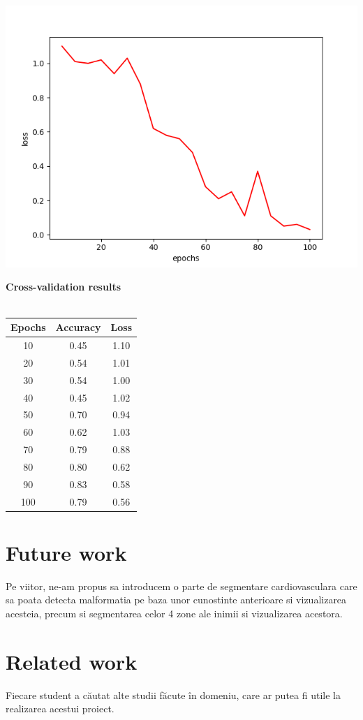 \documentclass[a4papaer,12pt]{article}
\begin{document}
\includegraphics[scale=0.5]{Loss-Epochs.png}


\indent \textbf{Cross-validation results}
\\
\\
\begin{tabular}{|c|c|c|}
	\hline
	Epochs & Accuracy & Loss \\
	\hline
	10 & 0.45 & 1.10 \\
	\hline
	20 & 0.54 & 1.01 \\
	\hline
	30 & 0.54 & 1.00 \\
	\hline
	40 & 0.45 & 1.02 \\	
	\hline
	50 & 0.70 & 0.94 \\
	\hline
	60 & 0.62 & 1.03 \\	
	\hline
	70 & 0.79 & 0.88 \\
	\hline
	80 & 0.80 & 0.62 \\	
	\hline
	90 & 0.83 & 0.58 \\
	\hline
	100 & 0.79 & 0.56 \\		
	\hline
\end{tabular}

\section{Future work}

Pe viitor, ne-am propus sa introducem o parte de segmentare cardiovasculara care sa poata detecta malformatia pe baza unor cunostinte anterioare si vizualizarea acesteia, precum si segmentarea celor 4 zone ale inimii si vizualizarea acestora. 
\newpage

\section{Related work}
Fiecare student a căutat alte studii făcute în domeniu, care ar putea fi utile la realizarea acestui proiect.
\end{document}
